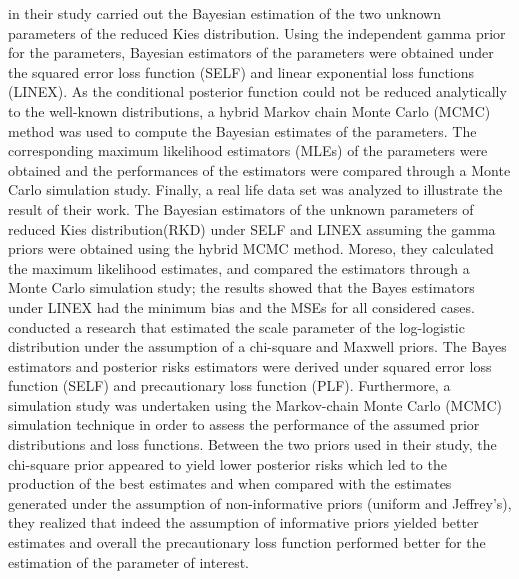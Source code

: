 \documentclass[a4paper,12pt]{report}
\newcommand{\para}{\hspace{0.5cm}}
\begin{document}
\noindent\para \cite{usta2019bayesian} in their study carried out the Bayesian estimation of the two unknown parameters of the reduced Kies distribution. Using the independent gamma prior for the parameters, Bayesian estimators of the parameters were obtained under the squared error loss function (SELF) and linear exponential loss functions (LINEX). As the conditional posterior function could not be reduced analytically to the well-known distributions, a hybrid Markov chain Monte Carlo (MCMC) method was used to compute the Bayesian estimates of the parameters. The corresponding maximum likelihood estimators (MLEs) of the parameters were obtained and the performances of the estimators were compared through a Monte Carlo simulation study. Finally, a real life data set was analyzed to illustrate the result of their work. The Bayesian estimators of the unknown parameters of reduced Kies distribution(RKD) under SELF and LINEX assuming the gamma priors were obtained using the hybrid MCMC method. Moreso, they calculated the maximum likelihood estimates, and compared the estimators through a Monte Carlo simulation study; the results showed that the Bayes estimators under LINEX had the minimum bias and the MSEs for all considered cases.\\

\noindent\para \cite{yahaya2017bayesian} conducted a research that estimated the scale parameter of the log-logistic distribution under the assumption of a chi-square and Maxwell priors. The Bayes estimators and posterior risks estimators were derived under squared error loss function (SELF) and precautionary loss function (PLF). Furthermore, a simulation study was undertaken using the Markov-chain Monte Carlo (MCMC) simulation technique in order to assess the performance of the assumed prior distributions and loss functions. Between the two priors used in their study, the chi-square prior appeared to yield lower posterior risks which led to the production of the best estimates and when compared with the estimates generated under the assumption of non-informative priors (uniform and Jeffrey’s), they realized that indeed the assumption of informative priors yielded better estimates and overall the precautionary loss function performed better for the estimation of the parameter of interest.\\
\end{document}
